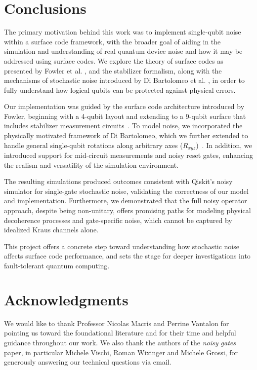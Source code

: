 \documentclass[9pt,a4paper,twocolumn,twoside]{tau-class/tau}
\begin{document}
\section{Conclusions}
The primary motivation behind this work was to implement single-qubit noise within a surface code framework, with the broader goal of aiding in the simulation and understanding of real quantum device noise and how it may be addressed using surface codes. We explore the theory of surface codes as presented by Fowler et al. \cite{fowler2012surface}, and the stabilizer formalism, along with the mechanisms of stochastic noise introduced by Di Bartolomeo et al. \cite{dibartolomeo2023noisy}, in order to fully understand how logical qubits can be protected against physical errors. 

Our implementation was guided by the surface code architecture introduced by Fowler, beginning with a 4-qubit layout and extending to a 9-qubit surface that includes stabilizer measurement circuits~\cite{fowler2012surface}. To model noise, we incorporated the physically motivated framework of Di Bartolomeo, which we further extended to handle general single-qubit rotations along arbitrary axes (\( R_{xyz} \))~\cite{dibartolomeo2023noisy}. In addition, we introduced support for mid-circuit measurements and noisy reset gates, enhancing the realism and versatility of the simulation environment. 

The resulting simulations produced outcomes consistent with Qiskit's noisy simulator for single-gate stochastic noise, validating the correctness of our model and implementation. Furthermore, we demonstrated that the full noisy operator approach, despite being non-unitary, offers promising paths for modeling physical decoherence processes and gate-specific noise, which cannot be captured by idealized Kraus channels alone.

This project offers a concrete step toward understanding how stochastic noise affects surface code performance, and sets the stage for deeper investigations into fault-tolerant quantum computing.

\section{Acknowledgments}
We would like to thank Professor Nicolas Macris and Perrine Vantalon for pointing us toward the foundational literature and for their time and helpful guidance throughout our work. We also thank the authors of the \textit{noisy gates} paper, in particular Michele Vischi, Roman Wixinger and Michele Grossi, for generously answering our technical questions via email. 
\newpage
\printbibliography
\newpage
\appendix
\end{document}
